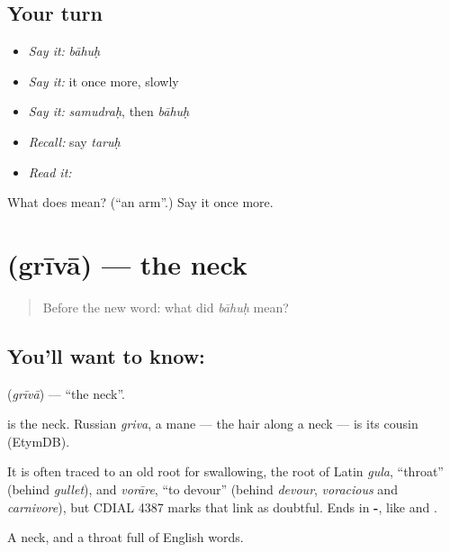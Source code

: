 \subsection*{Your turn}
\begin{itemize}
\raggedright
  \item \emph{Say it:} \emph{bāhuḥ}
  \item \emph{Say it:} it once more, slowly
  \item \emph{Say it:} \emph{samudraḥ}, then \emph{bāhuḥ}
  \item \emph{Recall:} say \emph{taruḥ}
  \item \emph{Read it:} \textbf{}
\end{itemize}

\begin{tcolorbox}[breakable,colback=teal!4,colframe=teal!35!black,title={Before you move on}]
What does  mean? (\textquotedblleft{}an arm\textquotedblright{}.) Say it once more.
\end{tcolorbox}
\section[\texorpdfstring{\sk{ग्रीवा} (grīvā)}{ग्रीवा (grīvā)}]{ (grīvā) — the neck}

\label{lesson:SA-C34-neck}



\begin{quote}
Before the new word: what did \emph{bāhuḥ} mean?
\end{quote}

\subsection*{You'll want to know: }
\textbf{} (\emph{grīvā}) — \textquotedblleft{}the neck\textquotedblright{}.

\textbf{} is the neck. Russian \emph{griva}, a mane — the hair along a neck — is its cousin (EtymDB).

It is often traced to an old root for swallowing, the root of Latin \emph{gula}, \textquotedblleft{}throat\textquotedblright{} (behind \emph{gullet}), and \emph{vorāre}, \textquotedblleft{}to devour\textquotedblright{} (behind \emph{devour}, \emph{voracious} and \emph{carnivore}), but CDIAL 4387 marks that link as doubtful. Ends in \textbf{-}, like \textbf{} and \textbf{}.

\begin{grammarlens}[title={What you've built}]
A neck, and a throat full of English words.
\end{grammarlens}

